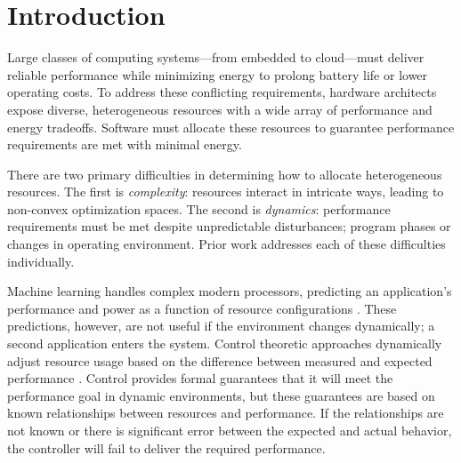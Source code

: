 \section{Introduction}
Large classes of computing systems---from embedded to cloud---must
deliver reliable performance while minimizing energy to prolong
battery life or lower operating costs.  To address these conflicting
requirements, hardware architects expose diverse, heterogeneous
resources with a wide array of performance and energy tradeoffs.
Software must allocate these resources to guarantee performance
requirements are met with minimal energy.


There are two primary difficulties in determining how to allocate
heterogeneous resources.  The first is \emph{complexity}: resources
interact in intricate ways, leading to non-convex optimization spaces.
The second is \emph{dynamics}: perfor\-mance requirements must be met
despite unpredictable disturbances; \eg{} program phases or changes in
operating environment.  Prior work addresses each of these
difficulties individually.

Machine learning handles complex modern processors, predicting an
application's performance and power as a function of resource
configurations
\cite{reddiHPCA2013,dubach2010,Bitirgen2008,Ipek,Koala,LEO,Flicker,Ponamarev,Paragon}.
These predictions, however, are not useful if the environment changes
dynamically; \eg{} a second application enters the system.  Control
theoretic approaches dynamically adjust resource usage based on the
difference between measured and expected performance
\cite{Steere99,grace,Hellerstein2004a,Chen2011,POET,ControlWare,Agilos,grace2,JouleGuard}.
Control provides formal guarantees that it will meet the performance
goal in dynamic environments, but these guarantees are based on known
relationships between resources and performance.  If the relationships
are not known or there is significant error between the expected and
actual behavior, the controller will fail to deliver the required
performance.

